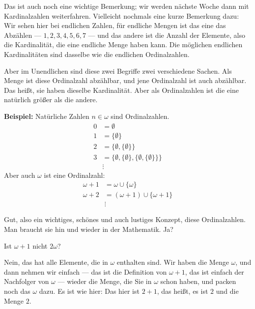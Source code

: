 \begin{spoken-clean}[00:13:30 - 00:15:30]
Das ist auch noch eine wichtige Bemerkung; wir werden nächste Woche dann mit Kardinalzahlen weiterfahren. Vielleicht nochmals eine kurze Bemerkung dazu: Wir sehen hier bei endlichen Zahlen, für endliche Mengen ist das eine das Abzählen --- $1, 2, 3, 4, 5, 6, 7$ --- und das andere ist die Anzahl der Elemente, also die Kardinalität, die eine endliche Menge haben kann. Die möglichen endlichen Kardinalitäten sind dasselbe wie die endlichen Ordinalzahlen. 

Aber im Unendlichen sind diese zwei Begriffe zwei verschiedene Sachen. Als Menge ist diese Ordinalzahl abzählbar, und jene Ordinalzahl ist auch abzählbar. Das heißt, sie haben dieselbe Kardinalität. Aber als Ordinalzahlen ist die eine natürlich größer als die andere.
\end{spoken-clean}

\begin{math-stroke}
\textbf{Beispiel:} Natürliche Zahlen $n \in \omega$ sind Ordinalzahlen.
\begin{align*}
0 &= \emptyset \\
1 &= \{ \emptyset \} \\
2 &= \{ \emptyset, \{ \emptyset \} \} \\
3 &= \{ \emptyset, \{ \emptyset \}, \{ \emptyset, \{ \emptyset \} \} \} \\
&\vdots
\end{align*}
Aber auch $\omega$ ist eine Ordinalzahl:
\begin{align*}
\omega+1 &= \omega \cup \{ \omega \} \\
\omega+2 &= (\omega+1) \cup \{ \omega+1 \} \\
&\vdots
\end{align*}
\end{math-stroke}

\begin{spoken-clean}[00:15:30 - 00:15:45]
Gut, also ein wichtiges, schönes und auch lustiges Konzept, diese Ordinalzahlen. Man braucht sie hin und wieder in der Mathematik. Ja?
\end{spoken-clean}

\begin{student-interaction}[Studentenfrage]
Ist $\omega+1$ nicht $2\omega$?
\end{student-interaction}

\begin{spoken-clean}[00:15:50 - 00:16:20]
Nein, das hat alle Elemente, die in $\omega$ enthalten sind. Wir haben die Menge $\omega$, und dann nehmen wir einfach --- das ist die Definition von $\omega+1$, das ist einfach der Nachfolger von $\omega$ --- wieder die Menge, die Sie in $\omega$ schon haben, und packen noch das $\omega$ dazu. Es ist wie hier: Das hier ist $2+1$, das heißt, es ist $2$ und die Menge $2$.
\end{spoken-clean}

